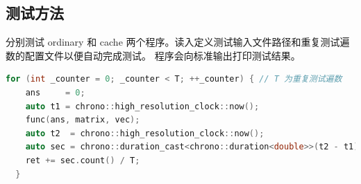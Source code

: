 \documentclass[a4paper]{article}
\begin{document}
\subsection{测试方法}
分别测试 ordinary 和 cache 两个程序。读入定义测试输入文件路径和重复测试遍数的配置文件以便自动完成测试。
程序会向标准输出打印测试结果。

\begin{lstlisting}[title=重复测试代码,frame=trbl,language={C++}]
  for (int _counter = 0; _counter < T; ++_counter) { // T 为重复测试遍数
    ans     = 0;
    auto t1 = chrono::high_resolution_clock::now();
    func(ans, matrix, vec);
    auto t2  = chrono::high_resolution_clock::now();
    auto sec = chrono::duration_cast<chrono::duration<double>>(t2 - t1);
    ret += sec.count() / T;
  }
\end{lstlisting}
\end{document}
